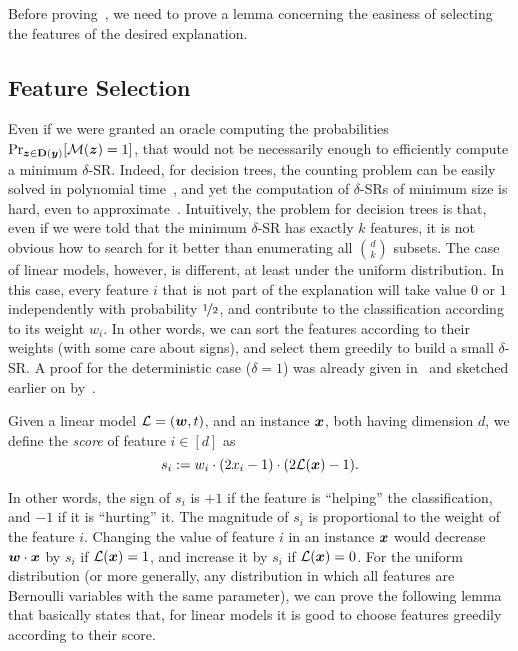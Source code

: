 Before proving~, we need to prove a lemma concerning the easiness of selecting the features of the desired explanation.

\subsection{Feature Selection}

Even if we were granted an oracle computing the probabilities
\(
    \Pr_{{\bm{z}}  \in \mathbf{D}({\bm{y}})}[\mathcal{M}({\bm{z}}) = 1]
\), that would not be necessarily enough to efficiently compute a minimum $\delta$-SR. Indeed, for decision trees, the counting problem can be easily solved in polynomial time~\cite{NEURIPS2020_b1adda14}, and yet the computation of $\delta$-SRs of minimum size is hard, even to approximate~\cite{NEURIPS2022_b8963f6a, Kozachinskiy_2023}.
Intuitively, the problem for decision trees is that, even if we were told that the minimum $\delta$-SR has exactly $k$ features, it is not obvious how to search for it better than enumerating all $\binom{d}{k}$ subsets. The case of linear models, however, is different, at least under the uniform distribution. In this case, every feature $i$ that is not part of the explanation will take value $0$ or $1$ independently with probability $\nicefrac{1}{2}$, and contribute to the classification according to its weight $w_i$. In other words, we can sort the features according to their weights (with some care about signs), and select them greedily to build a small $\delta$-SR. A proof for the deterministic case ($\delta = 1$) was already given in~\cite{NEURIPS2020_b1adda14} and sketched earlier on by~\cite{ExplainingNaiveBayes}.

\begin{definition}\label{def:scores}
    Given a linear model $\mathcal{L} = ({\bm{w}}, t)$, and an instance ${\bm{x}}$, both having dimension $d$, we define the \emph{score} of feature $i \in [d]$ as 
    \[
        s_i := w_i \cdot (2x_i - 1) \cdot (2\mathcal{L}({\bm{x}}) - 1).    
    \]
\end{definition}

In other words, the sign of $s_i$ is $+1$ if the feature is ``helping'' the classification, and $-1$ if it is ``hurting'' it. The magnitude of $s_i$ is proportional to the weight of the feature $i$. Changing the value of feature $i$ in an instance ${\bm{x}}$ would decrease ${\bm{w}} \cdot {\bm{x}}$ by $s_i$ if $\mathcal{L}({\bm{x}}) = 1$, and increase it by $s_i$ if $\mathcal{L}({\bm{x}}) = 0$.
For the uniform distribution (or more generally, any distribution in which all features are Bernoulli variables with the same parameter), we can prove the following lemma that basically states that, for linear models it is good to choose features greedily according to their score.

